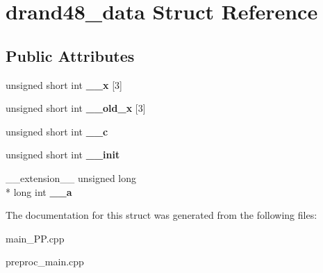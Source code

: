 \hypertarget{structdrand48__data}{\section{drand48\+\_\+data Struct Reference}
\label{structdrand48__data}
}
\subsection*{Public Attributes}
\begin{DoxyCompactItemize}
\item 
\hypertarget{structdrand48__data_a6b22f4f63c541ea64ed64c53b5c3422d}{unsigned short int {\bfseries \+\_\+\+\_\+x} \mbox{[}3\mbox{]}}\label{structdrand48__data_a6b22f4f63c541ea64ed64c53b5c3422d}

\item 
\hypertarget{structdrand48__data_a24d69967d7c682f7216d5853a5caf9ab}{unsigned short int {\bfseries \+\_\+\+\_\+old\+\_\+x} \mbox{[}3\mbox{]}}\label{structdrand48__data_a24d69967d7c682f7216d5853a5caf9ab}

\item 
\hypertarget{structdrand48__data_a1c5a6b052c80b63961ab54c784bca161}{unsigned short int {\bfseries \+\_\+\+\_\+c}}\label{structdrand48__data_a1c5a6b052c80b63961ab54c784bca161}

\item 
\hypertarget{structdrand48__data_a0bfb8bec3f32d789f9459459304e79e8}{unsigned short int {\bfseries \+\_\+\+\_\+init}}\label{structdrand48__data_a0bfb8bec3f32d789f9459459304e79e8}

\item 
\hypertarget{structdrand48__data_adfd08b81b0c160816d43d4a8c99b88b9}{\+\_\+\+\_\+extension\+\_\+\+\_\+ unsigned long \\*
long int {\bfseries \+\_\+\+\_\+a}}\label{structdrand48__data_adfd08b81b0c160816d43d4a8c99b88b9}

\end{DoxyCompactItemize}


The documentation for this struct was generated from the following files\+:\begin{DoxyCompactItemize}
\item 
main\+\_\+\+P\+P.\+cpp\item 
preproc\+\_\+main.\+cpp\end{DoxyCompactItemize}

